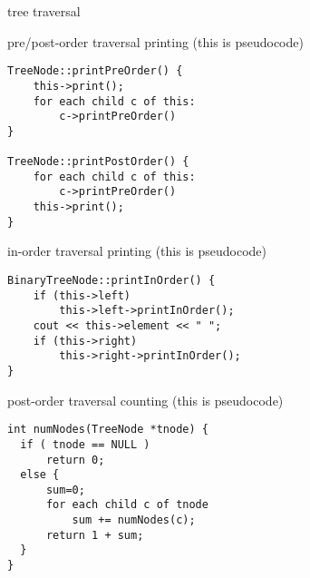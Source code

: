 
\usetikzlibrary{graphs}
\usetikzlibrary{graphdrawing}

\begin{frame}{tree traversal}
\end{frame}

\begin{frame}[fragile,label=prePostPrint]{pre/post-order traversal printing}
\lstset{language=C++,style=small}
(this is pseudocode)
\begin{lstlisting}
TreeNode::printPreOrder() {
    this->print();
    for each child c of this:
        c->printPreOrder()
}

TreeNode::printPostOrder() {
    for each child c of this:
        c->printPreOrder()
    this->print();
}
\end{lstlisting}
\end{frame}

\begin{frame}[fragile,label=inPrint]{in-order traversal printing}
\lstset{language=C++,style=small}
(this is pseudocode)
\begin{lstlisting}
BinaryTreeNode::printInOrder() {
    if (this->left)
        this->left->printInOrder();
    cout << this->element << " ";
    if (this->right)
        this->right->printInOrder();
}
\end{lstlisting}
\end{frame}

\begin{frame}[fragile,label=nonPrintTrav]{post-order traversal counting}
\lstset{language=C++,style=small}
(this is pseudocode)
\begin{lstlisting}
int numNodes(TreeNode *tnode) {
  if ( tnode == NULL )
      return 0;
  else {
      sum=0;
      for each child c of tnode
          sum += numNodes(c);
      return 1 + sum;
  }
}
\end{lstlisting}
\end{frame}
